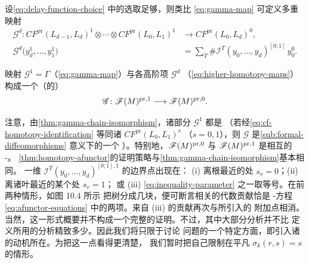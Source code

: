 设\eqref{eq:delay-function-choice} 中的选取足够\trGeneric，则类比
\eqref{eq:gamma-map} 可定义多重\trLinear{}映射
\begin{equation}\label{eq:higher-homotopy-maps}
\begin{split}
\mathscr{G}^d\colon CF^{\mathrm{pr}}(L_{d-1},L_d)^1\otimes\cdots\otimes
CF^{\mathrm{pr}}(L_0,L_1)^1&\longrightarrow CF^{\mathrm{pr}}(L_0,L_d)^0,\\
\mathscr{G}^d\bigl(y_d^1,\ldots,y_1^1\bigr)
&=\sum_T\#\mathscr{I}^T(y_0,\ldots,y_d)^{[0;1]}\,y_0^0.
\end{split}
\end{equation}
\begin{proposition}\label{thm:homotopy-afunctor}
映射 $\mathscr{G}^1=\Gamma$（\eqref{eq:gamma-map}）与各高阶项 $\mathscr{G}^d$
（\eqref{eq:higher-homotopy-maps}）构成一个（\trUngraded{}的）\trAFunctor
\begin{equation*}
\mathscr{G}\colon\mathscr{F}(M)^{\mathrm{pr},1}\longrightarrow\mathscr{F}(M)^{\mathrm{pr},0}.
\end{equation*}
\end{proposition}
注意，由\cref{thm:gamma-chain-isomorphism}，诸\trLinear{}部分 $\mathscr{G}^1$ 都是%
\trIsomorphism（若经\eqref{eq:cf-homotopy-identification} 等同诸 $CF^{\mathrm{pr}}(L_0,L_1)^s$
（$s=0,1$），则 $\mathscr{G}$ 是\cref{sub:formal-diffeomorphisms} 意义下的一个%
\trFormalDiffeomorphism）。特别地，$\mathscr{F}(M)^{\mathrm{pr},0}$ 与
$\mathscr{F}(M)^{\mathrm{pr},1}$ 是相互\trQuasiisomorphic{}的 \trAinfty-\trCategory。
\cref{thm:homotopy-afunctor}的证明策略与\cref{thm:gamma-chain-isomorphism}基本相同。
一维\trModuliSpace{} $\mathscr{I}^T(y_0,\ldots,y_d)^{[0;1],1}$ 的边界点出现在：
(i) 离根最近的\trVertex{}处 $s_v=0$；(ii) 离诸叶最近的某个\trVertex{}处 $s_v=1$；
或 (iii) \eqref{eq:inequality-parameter} 之一取等号。在前两种情形，如图 10.4 所示
把树分成几块，便可断言相关的代数贡献恰是 \trAinfty-\trFunctor{}方程
\eqref{eq:afunctor-equations} 中的两项。来自 (iii) 的贡献再次与\trGromov\trCompactification{}所引入的
附加点相消。当然，这一形式概要并不构成一个完整的证明。不过，其中大部分分析并不比
定义\trFukayaCategory{}所用的分析精致多少。因此我们将只限于讨论\trTransversality{}%
问题的一个特定方面，即引入诸\trDelayFunction{}的动机所在。为把这一点看得更清楚，
我们暂时把自己限制在平凡\trDelayFunction{} $\sigma_k(r,s)=s$ 的情形。
